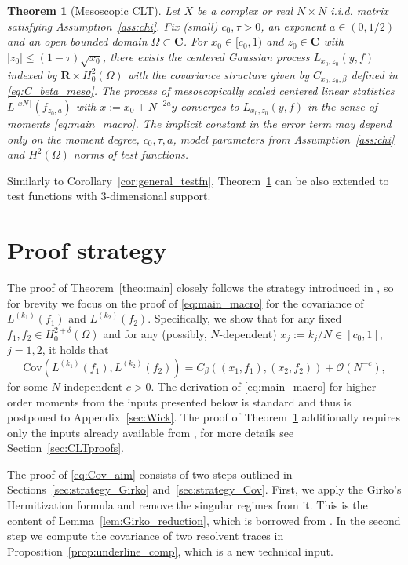 \documentclass[10pt]{amsart}
\newtheorem{theorem}{Theorem}[section]
\numberwithin{equation}{section}
\newcommand{\R}{\mathbf{R}}
\newcommand{\C}{\mathbf{C}}
\newcommand{\Cov}{\mathrm{Cov}}
\begin{document}
\begin{theorem}[Mesoscopic CLT]\label{theo:main_meso} Let $X$ be a complex or real $N\times N$ i.i.d. matrix satisfying Assumption~\ref{ass:chi}. Fix (small) $c_0, \tau>0$, an exponent $a\in (0,1/2)$ and an open bounded domain $\Omega\subset \C$. For $x_0\in [c_0,1)$ and $z_0\in\C$ with $|z_0|\le (1-\tau)\sqrt{x_0}$, there exists the centered Gaussian process $L_{x_0,z_0}(y,f)$ indexed by $\R\times H^2_0(\Omega)$ with the covariance structure given by $C_{x_0,z_0,\beta}$ defined in \eqref{eq:C_beta_meso}. The process of mesoscopically scaled centered linear statistics $L^{\lceil xN\rceil}(f_{z_0,a})$ with $x:=x_0+N^{-2a}y$ converges to $L_{x_0,z_0}(y,f)$ in the sense of moments \eqref{eq:main_macro}. The implicit constant in the error term may depend only on the moment degree, $c_0,\tau,a$, model parameters from Assumption~\ref{ass:chi} and $H^2(\Omega)$ norms of test functions.
\end{theorem}

Similarly to Corollary~\ref{cor:general_testfn}, Theorem~\ref{theo:main_meso} can be also extended to test functions with 3-dimensional support. 


\section{Proof strategy}\label{sec:strategy}

The proof of Theorem~\ref{theo:main} closely follows the strategy introduced in \cite{macroCLT_real, macroCLT_complex}, so for brevity we focus on the proof of \eqref{eq:main_macro} for the covariance of $L^{(k_1)}(f_1)$ and $L^{(k_2)}(f_2)$. Specifically, we show that for any fixed $f_1,f_2\in H^{2+\delta}_0(\Omega)$ and for any (possibly, $N$-dependent) $x_j:=k_j/N\in [c_0,1]$, $j=1,2$, it holds that
\begin{equation}
\Cov\left(L^{(k_1)}(f_1), L^{(k_2)}(f_2)\right) = C_\beta \left((x_1,f_1),(x_2,f_2)\right) + \mathcal{O}(N^{-c}),
\label{eq:Cov_aim}
\end{equation}
for some $N$-independent $c>0$. The derivation of \eqref{eq:main_macro} for higher order moments from the inputs presented below is standard and thus is postponed to Appendix~\ref{sec:Wick}. The proof of Theorem~\ref{theo:main_meso} additionally requires only the inputs already available from \cite{Cipolloni_meso}, for more details see Section~\ref{sec:CLTproofs}.

The proof of \eqref{eq:Cov_aim} consists of two steps outlined in Sections~\ref{sec:strategy_Girko} and~\ref{sec:strategy_Cov}. First, we apply the Girko's Hermitization formula and remove the singular regimes from it. This is the content of Lemma~\ref{lem:Girko_reduction}, which is borrowed from \cite{macroCLT_complex}. In the second step we compute the covariance of two resolvent traces in Proposition~\ref{prop:underline_comp}, which is a new technical input. 
\end{document}
